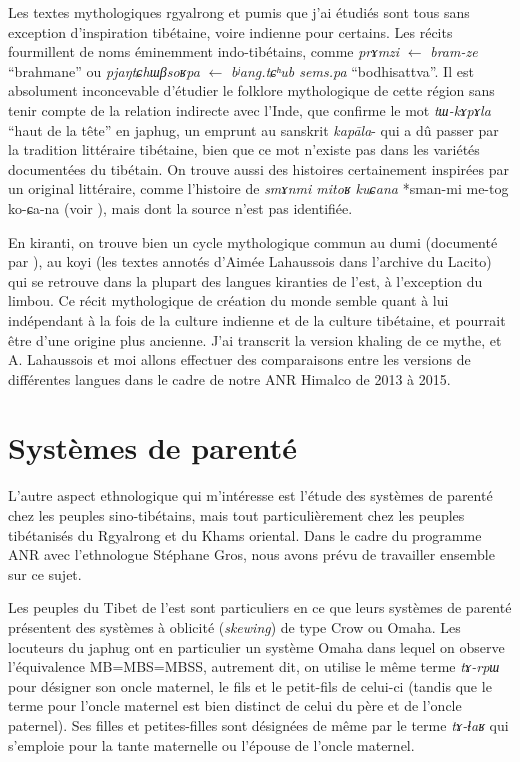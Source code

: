 \documentclass[oldfontcommands,oneside,a4paper,11pt]{memoir}
\begin{document}
Les textes mythologiques rgyalrong et pumis que j'ai étudiés sont tous sans exception d'inspiration tibétaine, voire  indienne pour certains. Les récits fourmillent de noms éminemment indo-tibétains, comme \textit{prɤmzi} $\leftarrow$ \textit{bram-ze} ``brahmane'' ou \textit{pjaŋtɕhɯβsoʁpa} $\leftarrow$ \textit{bʲang.tɕʰub sems.pa} ``bodhisattva''. Il est absolument inconcevable d'étudier le folklore mythologique de cette région sans tenir compte de la relation indirecte avec l'Inde, que confirme le mot \textit{tɯ-kɤpɤla} ``haut de la tête'' en japhug, un emprunt au sanskrit \textit{kapāla}- qui a dû passer par la tradition littéraire tibétaine, bien que ce mot n'existe pas dans les variétés documentées du tibétain. On trouve aussi des histoires certainement inspirées par un original littéraire, comme l'histoire de \textit{smɤnmi mitoʁ kuɕana} *sman-mi me-tog ko-ɕa-na (voir \citealt{jacques10gesar}), mais dont la source n'est pas identifiée.

En kiranti, on trouve bien un cycle mythologique commun au dumi (documenté par \citealt{driem93dumi}), au koyi (les textes annotés d'Aimée Lahaussois dans l'archive du Lacito)  qui se retrouve dans la plupart des langues kiranties de l'est, à l'exception du limbou. Ce récit mythologique de création du monde semble quant à lui indépendant à la fois de la culture indienne et de la culture tibétaine, et pourrait être d'une origine plus ancienne. J'ai transcrit la version khaling de ce mythe, et A. Lahaussois et moi allons effectuer des comparaisons entre les versions de différentes langues dans le cadre de notre ANR Himalco de 2013 à 2015.

 

\section{Systèmes de parenté}

L'autre aspect ethnologique qui m'intéresse est l'étude des systèmes de parenté chez les peuples sino-tibétains, mais tout particulièrement chez les peuples tibétanisés du Rgyalrong et du Khams oriental. Dans le cadre du programme ANR avec l'ethnologue Stéphane Gros, nous avons prévu de travailler ensemble sur ce sujet.

Les peuples du Tibet de l'est sont particuliers en ce que leurs systèmes de parenté présentent des systèmes à oblicité (\textit{skewing}) de type Crow ou Omaha. Les locuteurs du japhug ont en particulier un système Omaha dans lequel on observe l'équivalence MB=MBS=MBSS, autrement dit, on utilise le même terme \textit{tɤ-rpɯ} pour désigner son oncle maternel, le fils et le petit-fils de celui-ci (tandis que le terme pour l'oncle maternel est bien distinct de celui du père et de l'oncle paternel). Ses filles et petites-filles sont désignées de même par le terme \textit{tɤ-ɬaʁ} qui s'emploie pour la tante maternelle ou l'épouse de l'oncle maternel.
\end{document}
